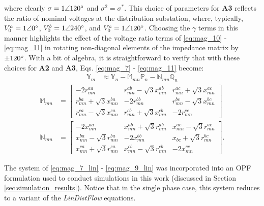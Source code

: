 \noindent where clearly $\sigma = 1 \angle 120\degree$ and $\sigma^{2} = \sigma^{*}$.  This choice of parameters for \textbf{A3} reflects the ratio of nominal voltages at the distribution substation, where, typically, $V_{0}^{a} = 1\angle 0 \degree$, $V_{0}^{b} = 1\angle 240 \degree$, and $V_{0}^{c} = 1\angle 120 \degree$.  Choosing the $\gamma$ terms in this manner highlights the effect of the voltage ratio terms of \eqref{eq:mag_10} - \eqref{eq:mag_11} in rotating non-diagonal elements of the impedance matrix by $ \pm 120 \degree$.  With a bit of algebra, it is straightforward to verify that with these choices for \textbf{A2} and \textbf{A3}, Eqs. \eqref{eq:mag_7} - \eqref{eq:mag_11} become:
\begin{align}
	\mathbb{Y}_{m} &\approx \mathbb{Y}_{n} - \mathbb{M}_{mn} \mathbb{P}_{n} - \mathbb{N}_{mn} \mathbb{Q}_{n} \label{eq:mag_7_lin}
\end{align}
\begin{align}
	\mathbb{M}_{mn} &=
	\begin{bmatrix}
		-2 r_{mn}^{aa} & r_{mn}^{ab} - \sqrt{3} x_{mn}^{ab} & r_{mn}^{ac} + \sqrt{3} x_{mn}^{ac} \\
		r_{mn}^{ba} + \sqrt{3} x_{mn}^{ba} & -2 r_{mn}^{bb} & r_{mn}^{bc} - \sqrt{3} x_{mn}^{bc} \\
		r_{mn}^{ca} - \sqrt{3} x_{mn}^{ca} & r_{mn}^{cb} + \sqrt{3} x_{mn}^{cb} & -2 r_{mn}^{cc}
	\end{bmatrix} \label{eq:mag_8_lin}\\
	\mathbb{N}_{mn} &=
	\begin{bmatrix}
		-2 x_{mn}^{aa} & x_{mn}^{ab} + \sqrt{3} r_{mn}^{ab} & x_{mn}^{ac} - \sqrt{3} r_{mn}^{ac} \\
		x_{mn}^{ba} -\sqrt{3} r_{mn}^{ba} & -2 x_{mn}^{bb} & x_{bc} + \sqrt{3} r_{mn}^{bc}\\
		x_{mn}^{ca} + \sqrt{3} r_{mn}^{ca} & x_{mn}^{cb} -\sqrt{3} r_{mn}^{cb} & -2 x_{mn}^{cc}
	\end{bmatrix} \label{eq:mag_9_lin}.
\end{align}

The system of \eqref{eq:mag_7_lin} - \eqref{eq:mag_9_lin} was incorporated into an OPF formulation used to conduct simulations in this work (discussed in Section \ref{sec:simulation_results}). Notice that in the single phase case, this system reduces to a variant of the \emph{LinDistFlow} equations.
